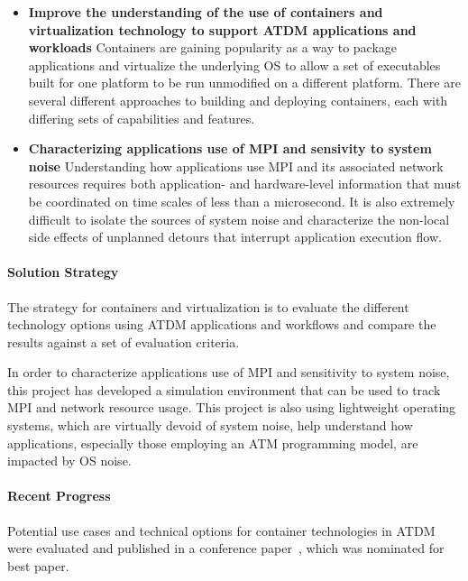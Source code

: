 \begin{itemize}

  \item {\bf Improve the understanding of the use of containers and
    virtualization technology to support ATDM applications and
    workloads} Containers are gaining popularity as a way to package
  applications and virtualize the underlying OS to allow a set of
  executables built for one platform to be run unmodified on a
  different platform. There are several different approaches to
  building and deploying containers, each with differing sets of
  capabilities and features.

  \item {\bf Characterizing applications use of MPI and sensivity to
      system noise}  Understanding how applications use MPI and its
    associated  network resources requires both application- and
    hardware-level information that must be coordinated on time scales
    of less than a microsecond. It is also extremely difficult to isolate
    the sources of system noise and characterize the non-local side
    effects of unplanned detours that interrupt application execution
    flow.

\end{itemize}


\paragraph{Solution Strategy}

The strategy for containers and virtualization is to evaluate the
different technology options using ATDM applications and workflows and
compare the results against a set of evaluation criteria.

In order to characterize applications use of MPI and sensitivity to
system noise, this project has developed a simulation environment that
can be used to track MPI and network resource usage. This project is
also using lightweight operating systems, which are virtually devoid
of system noise, help understand how applications, especially those
employing an ATM programming model, are impacted by OS noise.

\paragraph{Recent Progress}

Potential use cases and technical options for container technologies
in ATDM were evaluated and published in a conference
paper~\cite{Younge:Tale:2017}, which was nominated for best paper.


